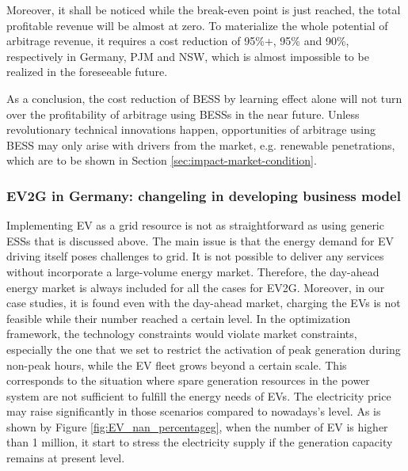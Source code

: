 Moreover, it shall be noticed while the break-even point is just reached, the total profitable revenue will be almost at zero. To materialize the whole potential of arbitrage revenue, it requires a cost reduction of 95\%+, 95\% and 90\%, respectively in Germany, PJM and NSW, which is almost impossible to be realized in the foreseeable future.

As a conclusion, the cost reduction of BESS by learning effect alone will not turn over the profitability of arbitrage using BESSs in the near future. Unless revolutionary technical innovations happen, opportunities of arbitrage using BESS may only arise with drivers from the market, e.g. renewable penetrations, which are to be shown in Section \ref{sec:impact-market-condition}.

\subsubsection{EV2G  in Germany: changeling in developing business model}
Implementing EV as a grid resource is not as straightforward as using generic ESSs that is discussed above. The main issue is that the energy demand for EV driving itself poses challenges to grid. It is not possible to deliver any services without incorporate a large-volume energy market. Therefore, the day-ahead energy market is always included for all the cases for EV2G. Moreover, in our case studies, it is found even with the day-ahead market, charging the EVs is not feasible while their number reached a certain level. In the optimization framework, the technology constraints would violate market constraints, especially the one that we set to restrict the activation of peak generation during non-peak hours, while the EV fleet grows beyond a certain scale. This corresponds to the situation where spare generation resources in the power system are not sufficient  to fulfill the energy needs of EVs. The electricity price may raise significantly in those scenarios compared to nowadays's level. As is shown by Figure \ref{fig:EV_nan_percentageg}, when the number of EV is higher than 1 million, it start to stress the electricity supply if the generation capacity remains at present level. 
